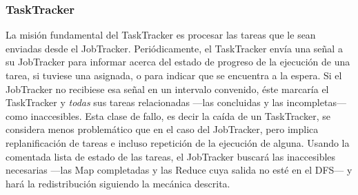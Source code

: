 \subsubsection{TaskTracker}\label{subsubsec:tasktracker}
\noindent La misi\'on fundamental del TaskTracker es procesar las tareas que le sean enviadas desde el JobTracker. Peri\'odicamente, el TaskTracker env\'ia una se\~nal a su JobTracker para informar acerca del estado de progreso de la ejecuci\'on de una tarea, si tuviese una asignada, o para indicar que se encuentra a la espera. Si el JobTracker no recibiese esa se\~nal en un intervalo convenido, \'este marcar\'ia el TaskTracker y \emph{todas} sus tareas relacionadas ---las concluidas y las incompletas--- como inaccesibles. Esta clase de fallo, es decir la ca\'ida de un TaskTracker, se considera menos problem\'atico que en el caso del JobTracker, pero implica replanificaci\'on de tareas e incluso repetici\'on de la ejecuci\'on de alguna. Usando la comentada lista de estado de las tareas, el JobTracker buscar\'a las inaccesibles necesarias ---las Map completadas y las Reduce cuya salida no est\'e en el DFS--- y har\'a la redistribuci\'on siguiendo la mec\'anica descrita.
